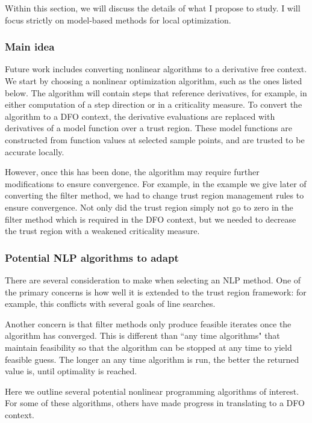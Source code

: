 \documentclass{article}
\begin{document}
Within this section, we will discuss the details of what I propose to study.
I will focus strictly on model-based methods for local optimization.

\subsubsection{Main idea}


Future work includes converting nonlinear algorithms to a derivative free context.
We start by choosing a nonlinear optimization algorithm, such as the ones listed below.
The algorithm will contain steps that reference derivatives, for example, in either computation of a step direction or in a criticality measure.
To convert the algorithm to a DFO context, the derivative evaluations are replaced with derivatives of a model function over a trust region.
These model functions are constructed from function values at selected sample points, and are trusted to be accurate locally.

However, once this has been done, the algorithm may require further modifications to ensure convergence.
For example, in the example we give later of converting the filter method, we had to change trust region management rules to ensure convergence.
Not only did the trust region simply not go to zero in the filter method which is required in the DFO context, but we needed to decrease the trust region with a weakened criticality measure.

\subsubsection{Potential NLP algorithms to adapt}

There are several consideration to make when selecting an NLP method.
One of the primary concerns is how well it is extended to the trust region framework: for example, this conflicts with several goals of line searches.

Another concern is that filter methods only produce feasible iterates once the algorithm has converged.
This is different than ``any time algorithms" that maintain feasibility so that the algorithm can be stopped at any time to yield feasible guess.
The longer an any time algorithm is run, the better the returned value is, until optimality is reached.

Here we outline several potential nonlinear programming algorithms of interest.
For some of these algorithms, others have made progress in translating to a DFO context.
\end{document}
